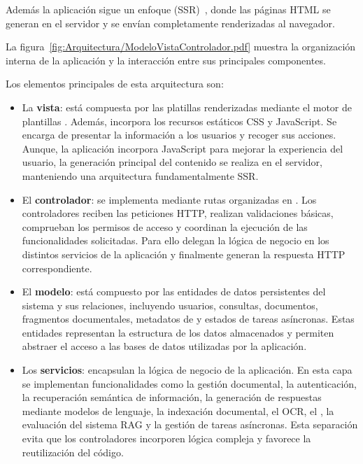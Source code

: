 Además la aplicación sigue un enfoque  (SSR)~\cite{diseño:SSR}, donde las páginas HTML se generan en el servidor y se envían completamente renderizadas al navegador.

La figura~\ref{fig:Arquitectura/ModeloVistaControlador.pdf} muestra la organización interna de la aplicación y la interacción entre sus principales componentes.


Los elementos principales de esta arquitectura son:

\begin{itemize}
	\item La \textbf{vista}: está compuesta por las platillas  renderizadas mediante el motor de plantillas . Además, incorpora los recursos estáticos CSS y JavaScript. Se encarga de presentar la información a los usuarios y recoger sus acciones. Aunque, la aplicación incorpora JavaScript para mejorar la experiencia del usuario, la generación principal del contenido se realiza en el servidor, manteniendo una arquitectura fundamentalmente SSR.
	\item El \textbf{controlador}: se implementa mediante rutas  organizadas en .	Los controladores reciben las peticiones HTTP, realizan validaciones básicas, comprueban los permisos de acceso y coordinan la ejecución de las funcionalidades solicitadas. Para ello delegan la lógica de negocio en los distintos servicios de la aplicación y finalmente generan la respuesta HTTP correspondiente. 
	\item El \textbf{modelo}: está compuesto por las entidades de datos persistentes del sistema y sus relaciones, incluyendo usuarios, consultas, documentos, fragmentos documentales, metadatos de  y estados de tareas asíncronas. Estas entidades representan la estructura de los datos almacenados y permiten abstraer el acceso a las bases de datos utilizadas por la aplicación.
	\item Los \textbf{servicios}: encapsulan la lógica de negocio de la aplicación. En esta capa se implementan funcionalidades como la gestión documental, la autenticación, la recuperación semántica de información, la generación de respuestas mediante modelos de lenguaje, la indexación documental, el OCR, el , la evaluación del sistema RAG y la gestión de tareas asíncronas. Esta separación evita que los controladores incorporen lógica compleja y favorece la reutilización del código.
	\end{itemize} 

